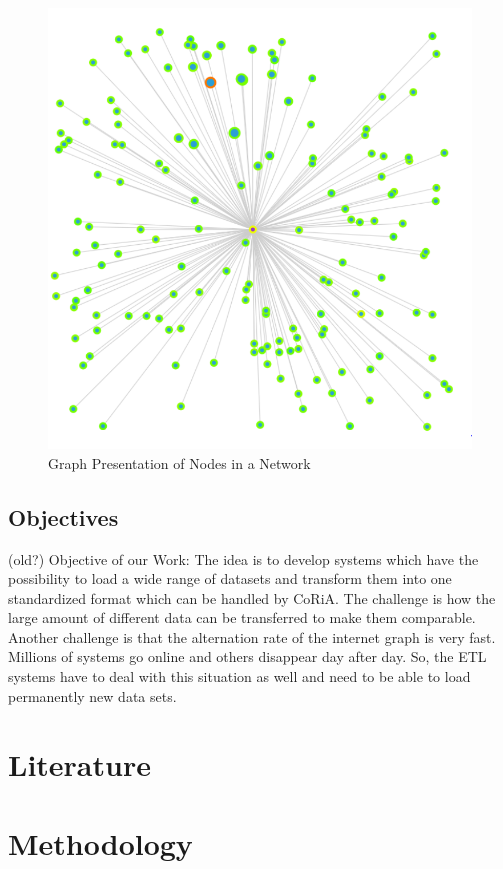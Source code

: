 \documentclass[conference]{IEEEtran}
\begin{document}
\begin{figure}[htbp]
\centerline{\includegraphics[scale=0.2]{Graphics/nodePresentaion.PNG}}
\caption{Graph Presentation of Nodes in a Network}
\label{fig}
\end{figure}


\subsection{Objectives}
(old?)
Objective of our Work:
The idea is to develop systems which have the possibility to load a wide range of datasets and transform them into one standardized format which can be handled by CoRiA.
The challenge is how the large amount of different data can be transferred to make them comparable.
Another challenge is that the alternation rate of the internet graph is very fast. Millions of systems go online and others disappear day after day. So, the ETL systems have to deal with this situation as well and need to be able to load permanently new data sets.

\section{Literature}

\section{Methodology}
\end{document}
